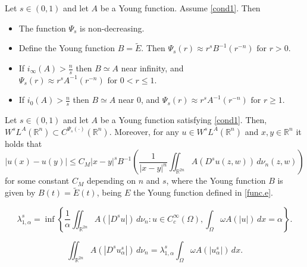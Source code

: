 \documentclass[10pt,a4paper]{amsart}
\begin{document}
\begin{lem} \label{lema1}
Let $s\in (0,1)$ and let $A$ be a Young function. Assume \eqref{cond1}. Then

\begin{itemize}
  \setlength\itemsep{0.5em}
\item[(i)] The function $\Psi_s$ is non-decreasing.

\item[(ii)] Define the Young function $B=\tilde E$. Then
$
\Psi_s(r)\approx r^s B^{-1}(r^{-n}) \text{ for } r>0.
$

\item[(iii)] If $i_\infty(A)>\frac{n}{s}$ then $B\simeq A$ near infinity, and
$
\Psi_s(r) \approx  r^s A^{-1}(r^{-n})  \text{ for } 0<r\leq 1.
$

\item[(iv)] If $i_0(A)>\frac{n}{s}$ then $B\simeq A$ near $0$, and
$
\Psi_s(r) \approx  r^s A^{-1}(r^{-n}) \text{ for } r\geq 1.
$ 
\end{itemize}
 
\end{lem}

\begin{prop} \label{morrey}
Let $s\in (0,1)$ and let $A$ be a Young function satisfying  \eqref{cond1}. Then, $W^s L^A(\mathbb{R}^n)\subset C^{\Psi_s(\cdot)}(\mathbb{R}^n)$. Moreover,  for any $u\in W^s L^A(\mathbb{R}^n)$ and $x,y\in \mathbb{R}^n$ it holds that
$$
|u(x)-u(y)|\leq C_M |x-y|^s B^{-1}\left( \frac{1}{|x-y|^n} \iint_{\mathbb{R}^{2n}} A(D^s u(z,w))\,d\nu_n(z,w) \right)
$$
for some constant $C_M$ depending on $n$ and $s$, where the Young function $B$ is given by $B(t)=\tilde E(t)$, being $E$ the Young function defined in \eqref{func.e}.
\end{prop}

\begin{equation} \label{minimi}
\lambda_{1,\alpha}^s = \inf\left\{\frac{1}{\alpha}\iint_{\mathbb{R}^{2n}} A(|D^s  u|)\, d\nu_n \colon u\in C_c^\infty(\Omega), \int_\Omega  \omega A(|u|)\, dx = \alpha\right\}.
\end{equation}

\begin{equation} \label{eq}
\iint_{\mathbb{R}^{2n}} A(|D^s u_\alpha^s|)\,d\nu_n = \lambda_{1,\alpha}^s \int_\Omega \omega A(|u_\alpha^s|)\,dx.
\end{equation}
\end{document}
